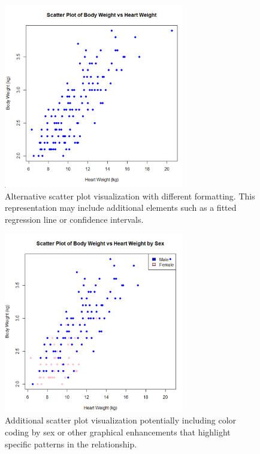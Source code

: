 \documentclass[a4paper,12pt]{article}
\begin{document}
\begin{figure}[H]
    \centering
    \includegraphics[width=0.7\textwidth]{scatterplot2.png}
    \caption{Alternative scatter plot visualization with different formatting. This representation may include additional elements such as a fitted regression line or confidence intervals.}
    \label{fig:scatterplot2}
\end{figure}

\begin{figure}[H]
    \centering
    \includegraphics[width=0.7\textwidth]{scatterplot3.png}
    \caption{Additional scatter plot visualization potentially including color coding by sex or other graphical enhancements that highlight specific patterns in the relationship.}
    \label{fig:scatterplot3}
\end{figure}
\end{document}
